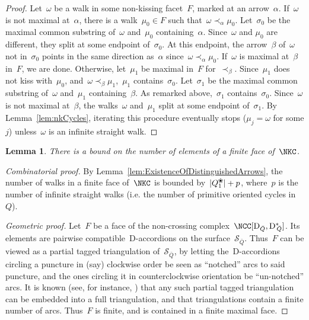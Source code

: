 \documentclass{amsart}
\newtheorem{lemma}[theorem]{Lemma}
\theoremstyle{definition}
\newcommand{\para}[1]{\medskip\noindent\textit{#1.}} %
\newcommand{\blossom}{^\text{\ding{96}}} %
\newcommand{\surface}{\mathcal{S}} %
\newcommand{\dual}{^*} %
\newcommand{\dissection}{\mathrm{D}} %
\begin{document}
\begin{proof}
Let~$\omega$ be a walk in some non-kissing facet~$F$, marked at an arrow~$\alpha$.
If~$\omega$ is not maximal at~$\alpha$, there is a walk~$\mu_0\in F$ such that~$\omega\prec_\alpha \mu_0$.
Let~$\sigma_0$ be the maximal common substring of~$\omega$ and~$\mu_0$ containing~$\alpha$.
Since~$\omega$ and $\mu_0$ are different, they split at some endpoint of~$\sigma_0$.
At this endpoint, the arrow~$\beta$ of~$\omega$ not in~$\sigma_0$ points in the same direction as~$\alpha$ since~$\omega \prec_\alpha \mu_0$.
If~$\omega$ is maximal at~$\beta$ in~$F$, we are done.
Otherwise, let~$\mu_1$ be maximal in~$F$ for~$\prec_\beta$.
Since~$\mu_1$ does not kiss with~$\mu_0$, and~$\omega\prec_\beta\mu_1$,~$\mu_1$ contains~$\sigma_0$.
Let~$\sigma_1$ be the maximal common substring of~$\omega$ and~$\mu_1$ containing~$\beta$.
As remarked above,~$\sigma_1$ contains~$\sigma_0$.
Since~$\omega$ is not maximal at~$\beta$, the walks~$\omega$ and~$\mu_1$ split at some endpoint of~$\sigma_1$.
By Lemma~\ref{lem:nkCycles}, iterating this procedure eventually stops ($\mu_j=\omega$ for some $j$) unless~$\omega$ is an infinite straight walk.
\end{proof}

\begin{lemma}
\label{lemm:facesAreBounded}
There is a bound on the number of elements of a finite face of~$\NKC$.
\end{lemma}

\begin{proof}[Combinatorial proof]
By Lemma~\ref{lem:ExistenceOfDistinguishedArrows}, the number of walks in a finite face of~$\NKC$ is bounded by~$|Q_1\blossom|+p$, where~$p$ is the number of infinite straight walks (i.e. the number of primitive oriented cycles in~$Q$).

\para{Geometric proof}
Let~$F$ be a face of the non-crossing complex~$\NCC[\dissection_{\bar Q}, {\dissection\dual\!\!_{\bar Q}}]$.
Its elements are pairwise compatible~$\dissection$-accordions on the surface~$\surface_{\bar Q}$.
Thus~$F$ can be viewed as a partial tagged triangulation of~$\surface_{\bar Q}$, by letting the~$\dissection$-accordions circling a puncture in (say) clockwise order be seen as ``notched'' arcs to said puncture, and the ones circling it in counterclockwise orientation be ``un-notched'' arcs.
It is known (see, for instance, \cite{FominShapiroThurston}) that any such partial tagged triangulation can be embedded into a full triangulation, and that triangulations contain a finite number of arcs.
Thus~$F$ is finite, and is contained in a finite maximal face.
\end{proof}
\end{document}
